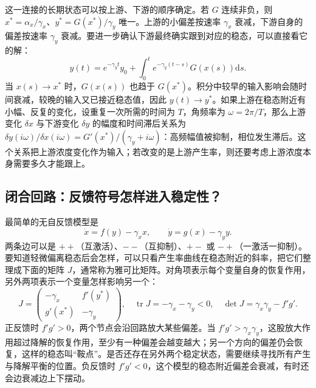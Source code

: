 \documentclass[11pt,a4paper,UTF8,fontset=fandol]{ctexart}
\newcommand{\dd}{\mathrm d}\newcommand{\R}{\mathbb R}\newcommand{\ssv}{\mathrm{ss}}
\begin{document}
这一连接的长期状态可以按上游、下游的顺序确定。若 $G$ 连续非负，则 $x^*=\alpha_x/\gamma_x$、$y^*=G(x^*)/\gamma_y$ 唯一。上游的小偏差按速率 $\gamma_x$ 衰减，下游自身的偏差按速率 $\gamma_y$ 衰减。要进一步确认下游最终确实跟到对应的稳态，可以直接看它的解：
\[
y(t)=e^{-\gamma_yt}y_0+\int_0^t e^{-\gamma_y(t-s)}G(x(s))\dd s.
\]
当 $x(s)\to x^*$ 时，$G(x(s))$ 也趋于 $G(x^*)$。积分中较早的输入影响会随时间衰减，较晚的输入又已接近稳态值，因此 $y(t)\to y^*$。如果上游在稳态附近有小幅、反复的变化，设重复一次所需的时间为 $T$，角频率为 $\omega=2\pi/T$，那么上游变化 $\delta x$ 与下游变化 $\delta y$ 的幅度和时间滞后关系为
$\delta y(i\omega)/\delta x(i\omega)=G'(x^*)/(\gamma_y+i\omega)$：高频幅值被抑制，相位发生滞后。这个关系把上游浓度变化作为输入；若改变的是上游产生率，则还要考虑上游浓度本身需要多久才能跟上。

\subsection{闭合回路：反馈符号怎样进入稳定性？}
最简单的无自反馈模型是
\begin{equation}\dot x=f(y)-\gamma_xx,\qquad\dot y=g(x)-\gamma_yy.\label{eq:two}\end{equation}
两条边可以是 $++$（互激活）、$--$（互抑制）、$+-$ 或 $-+$（一激活一抑制）。要知道轻微偏离稳态后会怎样，可以只看产生率曲线在稳态附近的斜率，把它们整理成下面的矩阵 $J$，通常称为雅可比矩阵。对角项表示每个变量自身的恢复作用，另外两项表示一个变量怎样影响另一个：
\begin{equation}J=\begin{pmatrix}-\gamma_x&f'(y^*)\\g'(x^*)&-\gamma_y\end{pmatrix},\quad \operatorname{tr}J=-\gamma_x-\gamma_y<0,\quad\det J=\gamma_x\gamma_y-f'g'.\end{equation}
正反馈时 $f'g'>0$，两个节点会沿回路放大某些偏差。当 $f'g'>\gamma_x\gamma_y$，这股放大作用超过降解的恢复作用，至少有一种偏差会越变越大；另一个方向的偏差仍会恢复，这样的稳态叫“鞍点”。是否还存在另外两个稳定状态，需要继续寻找所有产生与降解平衡的位置。负反馈时 $f'g'<0$，这个模型的稳态附近偏差会衰减，有时还会边衰减边上下摆动。
\end{document}
